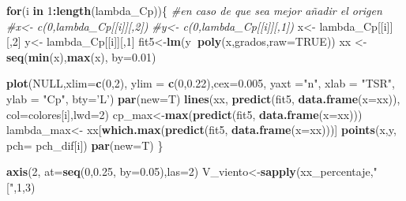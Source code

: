 \documentclass[]{article}
\newenvironment{Shaded}{\begin{snugshade}}{\end{snugshade}}
\newcommand{\KeywordTok}[1]{\textcolor[rgb]{0.13,0.29,0.53}{\textbf{#1}}}
\newcommand{\DataTypeTok}[1]{\textcolor[rgb]{0.13,0.29,0.53}{#1}}
\newcommand{\DecValTok}[1]{\textcolor[rgb]{0.00,0.00,0.81}{#1}}
\newcommand{\FloatTok}[1]{\textcolor[rgb]{0.00,0.00,0.81}{#1}}
\newcommand{\StringTok}[1]{\textcolor[rgb]{0.31,0.60,0.02}{#1}}
\newcommand{\CommentTok}[1]{\textcolor[rgb]{0.56,0.35,0.01}{\textit{#1}}}
\newcommand{\OtherTok}[1]{\textcolor[rgb]{0.56,0.35,0.01}{#1}}
\newcommand{\ControlFlowTok}[1]{\textcolor[rgb]{0.13,0.29,0.53}{\textbf{#1}}}
\newcommand{\OperatorTok}[1]{\textcolor[rgb]{0.81,0.36,0.00}{\textbf{#1}}}
\newcommand{\NormalTok}[1]{#1}
\begin{document}
\begin{Shaded}
\begin{Highlighting}[]
{{    \ControlFlowTok{for}\NormalTok{(i }\ControlFlowTok{in} \DecValTok{1}\OperatorTok{:}\KeywordTok{length}\NormalTok{(lambda_Cp))\{}
      \CommentTok{#en caso de que sea mejor añadir el origen}
      \CommentTok{#x<- c(0,lambda_Cp[[i]][,2])}
      \CommentTok{#y<- c(0,lambda_Cp[[i]][,1])}
\NormalTok{      x<-}\StringTok{ }\NormalTok{lambda_Cp[[i]][,}\DecValTok{2}\NormalTok{]}
\NormalTok{      y<-}\StringTok{ }\NormalTok{lambda_Cp[[i]][,}\DecValTok{1}\NormalTok{]}
\NormalTok{      fit5<-}\KeywordTok{lm}\NormalTok{(y}\OperatorTok{~}\KeywordTok{poly}\NormalTok{(x,grados,}\DataTypeTok{raw=}\OtherTok{TRUE}\NormalTok{))}
\NormalTok{      xx <-}\StringTok{ }\KeywordTok{seq}\NormalTok{(}\KeywordTok{min}\NormalTok{(x),}\KeywordTok{max}\NormalTok{(x), }\DataTypeTok{by=}\FloatTok{0.01}\NormalTok{)}
      
      \KeywordTok{plot}\NormalTok{(}\OtherTok{NULL}\NormalTok{,}\DataTypeTok{xlim=}\KeywordTok{c}\NormalTok{(}\DecValTok{0}\NormalTok{,}\DecValTok{2}\NormalTok{),}
           \DataTypeTok{ylim =} \KeywordTok{c}\NormalTok{(}\DecValTok{0}\NormalTok{,}\FloatTok{0.22}\NormalTok{),}\DataTypeTok{cex=}\FloatTok{0.005}\NormalTok{, }\DataTypeTok{yaxt =}\StringTok{"n"}\NormalTok{,}
           \DataTypeTok{xlab =} \StringTok{"TSR"}\NormalTok{, }\DataTypeTok{ylab =} \StringTok{"Cp"}\NormalTok{, }\DataTypeTok{bty=}\StringTok{'L'}\NormalTok{)}
      \KeywordTok{par}\NormalTok{(}\DataTypeTok{new=}\NormalTok{T)}
      \KeywordTok{lines}\NormalTok{(xx, }\KeywordTok{predict}\NormalTok{(fit5, }\KeywordTok{data.frame}\NormalTok{(}\DataTypeTok{x=}\NormalTok{xx)), }\DataTypeTok{col=}\NormalTok{colores[i],}\DataTypeTok{lwd=}\DecValTok{2}\NormalTok{)}
\NormalTok{      cp_max<-}\KeywordTok{max}\NormalTok{(}\KeywordTok{predict}\NormalTok{(fit5, }\KeywordTok{data.frame}\NormalTok{(}\DataTypeTok{x=}\NormalTok{xx)))}
\NormalTok{      lambda_max<-}\StringTok{ }\NormalTok{xx[}\KeywordTok{which.max}\NormalTok{(}\KeywordTok{predict}\NormalTok{(fit5, }\KeywordTok{data.frame}\NormalTok{(}\DataTypeTok{x=}\NormalTok{xx)))]}
      \KeywordTok{points}\NormalTok{(x,y, }\DataTypeTok{pch=}\NormalTok{ pch_dif[i])}
      \KeywordTok{par}\NormalTok{(}\DataTypeTok{new=}\NormalTok{T)}
\NormalTok{    \}}
    
    \KeywordTok{axis}\NormalTok{(}\DecValTok{2}\NormalTok{, }\DataTypeTok{at=}\KeywordTok{seq}\NormalTok{(}\DecValTok{0}\NormalTok{,}\FloatTok{0.25}\NormalTok{, }\DataTypeTok{by=}\FloatTok{0.05}\NormalTok{),}\DataTypeTok{las=}\DecValTok{2}\NormalTok{)}
\NormalTok{    V_viento<-}\KeywordTok{sapply}\NormalTok{(xx_percentaje,}\StringTok{"["}\NormalTok{,}\DecValTok{1}\NormalTok{,}\DecValTok{3}\NormalTok{)}
    
}}
\end{Highlighting}
\end{Shaded}
\end{document}
